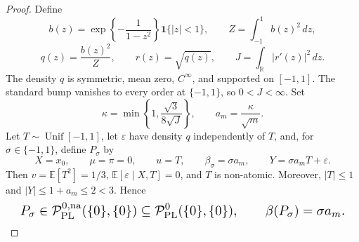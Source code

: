\documentclass{article}
\begin{document}
\begin{proof}
Define
\[
b(z)=\exp\!\left\{-\frac{1}{1-z^2}\right\}\mathbf 1\{|z|<1\},\qquad Z=\int_{-1}^1b(z)^2\,dz,
\]
\[
q(z)=\frac{b(z)^2}{Z},\qquad r(z)=\sqrt{q(z)},\qquad J=\int_{\mathbb R}|r'(z)|^2\,dz.
\]
The density \(q\) is symmetric, mean zero, \(C^\infty\), and supported on \([-1,1]\). The standard bump vanishes to every order at \(\{-1,1\}\), so \(0<J<\infty\). Set
\[
\kappa=\min\left\{1,\frac{\sqrt3}{8\sqrt J}\right\},\qquad a_m=\frac{\kappa}{\sqrt m}.
\]
Let \(T\sim\operatorname{Unif}[-1,1]\), let \(\varepsilon\) have density \(q\) independently of \(T\), and, for \(\sigma\in\{-1,1\}\), define \(P_\sigma\) by
\[
X=x_0,\qquad \mu=\pi=0,\qquad u=T,\qquad \beta_\sigma=\sigma a_m,\qquad Y=\sigma a_mT+\varepsilon.
\]
Then \(v=\mathbb E[T^2]=1/3\), \(\mathbb E[\varepsilon\mid X,T]=0\), and \(T\) is non-atomic. Moreover, \(|T|\le1\) and \(|Y|\le1+a_m\le2<3\). Hence
\[
\makebox[\linewidth][c]{\resizebox{0.98\linewidth}{!}{\par\noindent \makebox[\linewidth][c]{\resizebox{0.98\linewidth}{!}{\(\displaystyle \displaystyle P_\sigma\in\mathcal P_{\rm PL}^{0,\rm na}(\{0\},\{0\})\subseteq\mathcal P_{\rm PL}^{0}(\{0\},\{0\}),\qquad \beta(P_\sigma)=\sigma a_m.\)}}\par\noindent}}
\]


\end{proof}
\end{document}
